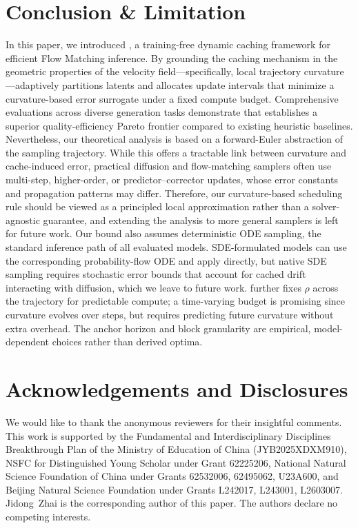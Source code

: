 \section{Conclusion \& Limitation}
\label{sec:conclusion}
In this paper, we introduced \cubic, a training-free dynamic caching framework for efficient Flow Matching inference. By grounding the caching mechanism in the geometric properties of the velocity field---specifically, local trajectory curvature---\cubic adaptively partitions latents and allocates update intervals that minimize a curvature-based error surrogate under a fixed compute budget. Comprehensive evaluations across diverse generation tasks demonstrate that \cubic establishes a superior quality-efficiency Pareto frontier compared to existing heuristic baselines. 
Nevertheless, our theoretical analysis is based on a forward-Euler abstraction of the sampling trajectory. While this offers a tractable link between curvature and cache-induced error, practical diffusion and flow-matching samplers often use multi-step, higher-order, or predictor--corrector updates, whose error constants and propagation patterns may differ. Therefore, our curvature-based scheduling rule should be viewed as a principled local approximation rather than a solver-agnostic guarantee, and extending the analysis to more general samplers is left for future work.
Our bound also assumes deterministic ODE sampling, the standard inference path of all evaluated models. SDE-formulated models can use the corresponding probability-flow ODE and apply \cubic directly, but native SDE sampling requires stochastic error bounds that account for cached drift interacting with diffusion, which we leave to future work. \cubic further fixes $\rho$ across the trajectory for predictable compute; a time-varying budget is promising since curvature evolves over steps, but requires predicting future curvature without extra overhead. The anchor horizon and block granularity are empirical, model-dependent choices rather than derived optima.

\section*{Acknowledgements and Disclosures}
We would like to thank the anonymous reviewers for their insightful comments. This work is supported by the Fundamental and Interdisciplinary Disciplines Breakthrough Plan of the Ministry of Education of China (JYB2025XDXM910), NSFC for Distinguished Young Scholar under Grant 62225206, National Natural Science Foundation of China under Grants 62532006, 62495062, U23A600, and Beijing Natural Science Foundation under Grants L242017, L243001, L2603007. Jidong~Zhai is the corresponding author of this paper. The authors declare no competing interests.



